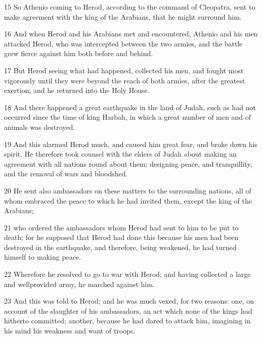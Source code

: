 \par 15 So Athenio coming to Herod, according to the command of Cleopatra, sent to make agreement with the king of the Arabians, that he might surround him. 

\par 16 And when Herod and his Arabians met and encountered, Athenio and his men attacked Herod, who was intercepted between the two armies, and the battle grew fierce against him both before and behind. 

\par 17 But Herod seeing what had happened, collected his men, and fought most vigorously until they were beyond the reach of both armies, after the greatest exertion; and he returned into the Holy House. 

\par 18 And there happened a great earthquake in the land of Judah, such as had not occurred since the time of king Harbah, in which a great number of men and of animals was destroyed. 

\par 19 And this alarmed Herod much, and caused him great fear, and broke down his spirit. He therefore took counsel with the elders of Judah about making an agreement with all nations round about them; designing peace, and tranquillity, and the removal of wars and bloodshed. 

\par 20 He sent also ambassadors on these matters to the surrounding nations, all of whom embraced the peace to which he had invited them, except the king of the Arabians; 

\par 21 who ordered the ambassadors whom Herod had sent to him to be put to death; for he supposed that Herod had done this because his men had been destroyed in the earthquake, and therefore, being weakened, he had turned himself to making peace. 

\par 22 Wherefore he resolved to go to war with Herod; and having collected a large and wellprovided army, he marched against him. 

\par 23 And this was told to Herod; and he was much vexed, for two reasons: one, on account of the slaughter of his ambassadors, an act which none of the kings had hitherto committed; another, because he had dared to attack him, imagining in his mind his weakness and want of troops. 

